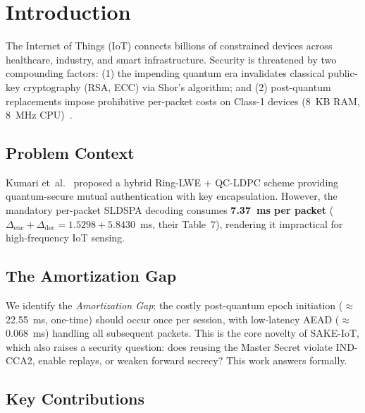 \documentclass[runningheads]{llncs}
\begin{document}
\section{Introduction}
\label{sec:intro}

The Internet of Things (IoT) connects billions of constrained devices across
healthcare, industry, and smart infrastructure. Security is threatened by two
compounding factors: (1) the impending quantum era invalidates classical
public-key cryptography (RSA, ECC) via Shor's algorithm; and (2) post-quantum
replacements impose prohibitive per-packet costs on Class-1 devices
(8~KB RAM, 8~MHz CPU)~\cite{rfc7228}.

\subsection{Problem Context}

Kumari et~al.~\cite{kumari2022} proposed a hybrid Ring-LWE + QC-LDPC scheme
providing quantum-secure mutual authentication with key encapsulation.
However, the mandatory per-packet SLDSPA decoding consumes
\textbf{7.37~ms per packet} ($\Delta_{\mathrm{enc}} + \Delta_{\mathrm{dec}}
= 1.5298 + 5.8430$~ms, their Table~7), rendering it impractical for
high-frequency IoT sensing.

\subsection{The Amortization Gap}

We identify the \emph{Amortization Gap}: the costly post-quantum epoch
initiation ($\approx$22.55~ms, one-time) should occur once per session, with
low-latency AEAD ($\approx$0.068~ms) handling all subsequent packets. This is
the core novelty of SAKE-IoT, which also raises a security question: does
reusing the Master Secret violate IND-CCA2, enable replays, or weaken forward
secrecy? This work answers formally.

\subsection{Key Contributions}
\end{document}
